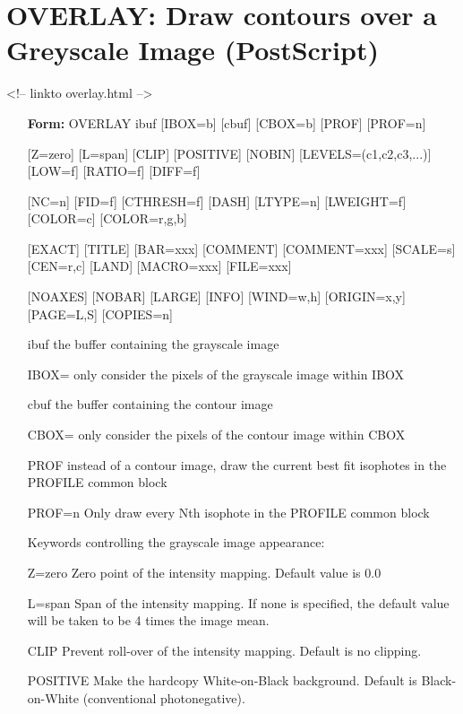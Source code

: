 \section{OVERLAY: Draw contours over a Greyscale Image (PostScript)}
\begin{rawhtml}
<!-- linkto overlay.html -->
\end{rawhtml}
\begin{itemize}
  \item[\textbf{Form:} OVERLAY ibuf {[IBOX=b]} {[cbuf]} {[CBOX=b]} {[PROF]} 
       {[PROF=n]}\hfill]{}
  \item[{[Z=zero]} {[L=span]} {[CLIP]} {[POSITIVE]} {[NOBIN]}
        {[LEVELS=(c1,c2,c3,...)]} {[LOW=f]} {[RATIO=f]} {[DIFF=f]}]{}
  \item[{[NC=n]} {[FID=f]} {[CTHRESH=f]} {[DASH]} {[LTYPE=n]} {[LWEIGHT=f]} 
        {[COLOR=c]} {[COLOR=r,g,b]}]{}
  \item[{[EXACT]} {[TITLE]} {[BAR=xxx]} {[COMMENT]} {[COMMENT=xxx]}
        {[SCALE=s]} {[CEN=r,c]} {[LAND]} {[MACRO=xxx]} {[FILE=xxx]}]{}
  \item[{[NOAXES]} {[NOBAR]} {[LARGE]} {[INFO]} {[WIND=w,h]} {[ORIGIN=x,y]} 
        {[PAGE=L,S]} {[COPIES=n]}]{}
  \item[ibuf ]{the buffer containing the grayscale image}
  \item[IBOX=]{only consider the pixels of the grayscale image within IBOX}
  \item[cbuf]{ the buffer containing the contour image}
  \item[CBOX=]{only consider the pixels of the contour image within CBOX}
  \item[PROF]{ instead of a contour image, draw the current best fit 
isophotes in the PROFILE common block}
  \item[PROF=n]{Only draw every Nth isophote in the PROFILE common block}
  \item[Keywords controlling the grayscale image appearance:\hfill]{}
  \item[Z=zero ]{Zero point of the intensity mapping.  Default value is 0.0}
  \item[L=span]{Span of the intensity mapping.  If none is specified, the 
                default value will be taken to be 4 times the image mean.}
  \item[CLIP]{Prevent roll-over of the intensity mapping.  Default is 
              no clipping.}
  \item[POSITIVE]{Make the hardcopy White-on-Black background.  Default is 
                  Black-on-White (conventional photonegative).}

\end{itemize}
